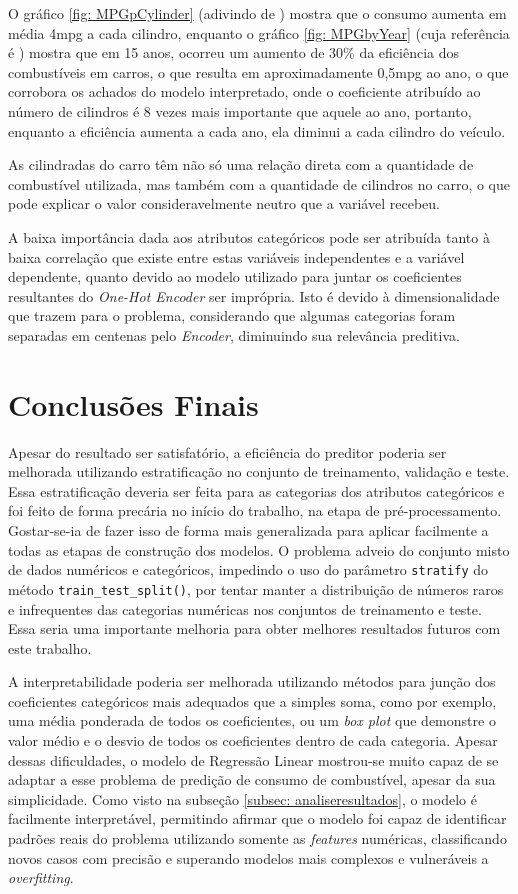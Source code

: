 \documentclass{report}
\let\oldsection\section
\renewcommand\section{\clearpage\oldsection}
\begin{document}
O gráfico \ref{fig: MPGpCylinder} (adivindo de \cite{CylinderXMPG}) mostra que o consumo aumenta em média 4mpg a cada cilindro, enquanto o gráfico \ref{fig: MPGbyYear}
(cuja referência é \cite{YearXMPG}) mostra que em 15 anos, ocorreu um aumento de 30\% da eficiência dos combustíveis em carros, o que resulta em aproximadamente 0,5mpg ao ano,
o que corrobora os achados do modelo interpretado, onde o coeficiente atribuído ao número de cilindros é 8 vezes mais importante que aquele ao ano,
portanto, enquanto a eficiência aumenta a cada ano, ela diminui a cada cilindro do veículo.

As cilindradas do carro têm não só uma relação direta com a quantidade de combustível utilizada, mas também com a quantidade de cilindros no carro,
o que pode explicar o valor consideravelmente neutro que a variável recebeu.

A baixa importância dada aos atributos categóricos pode ser atribuída tanto à baixa correlação que existe entre estas variáveis independentes e a
variável dependente, quanto devido ao modelo utilizado para juntar os coeficientes resultantes do \textit{One-Hot Encoder} ser imprópria. Isto é devido à
dimensionalidade que trazem para o problema, considerando que algumas categorias foram separadas em centenas pelo \textit{Encoder}, diminuindo sua relevância preditiva.

\section{Conclusões Finais}
Apesar do resultado ser satisfatório, a eficiência do preditor poderia ser melhorada utilizando estratificação no conjunto de treinamento, validação e teste. Essa estratificação
deveria ser feita para as categorias dos atributos categóricos e foi feito de forma precária no início do trabalho, na etapa de pré-processamento. Gostar-se-ia de fazer isso de forma
mais generalizada para aplicar facilmente a todas as etapas de construção dos modelos. O problema adveio do conjunto misto de dados numéricos e categóricos, impedindo o uso do parâmetro
\texttt{stratify} do método \texttt{train\_test\_split()}, por tentar manter a distribuição de números raros e infrequentes das categorias numéricas nos conjuntos de treinamento e teste.
Essa seria uma importante melhoria para obter melhores resultados futuros com este trabalho.

A interpretabilidade poderia ser melhorada utilizando métodos para junção dos coeficientes categóricos mais adequados que a simples soma, como por exemplo, uma média ponderada de todos os
coeficientes, ou um \textit{box plot} que demonstre o valor médio e o desvio de todos os coeficientes dentro de cada categoria. Apesar dessas dificuldades, o modelo de Regressão Linear
mostrou-se muito capaz de se adaptar a esse problema de predição de consumo de combustível, apesar da sua simplicidade. Como visto na subseção \ref{subsec: analiseresultados}, o modelo
é facilmente interpretável, permitindo afirmar que o modelo foi capaz de identificar padrões reais do problema utilizando somente as \textit{features} numéricas, classificando novos casos
com precisão e superando modelos mais complexos e vulneráveis a \textit{overfitting}.
\end{document}
